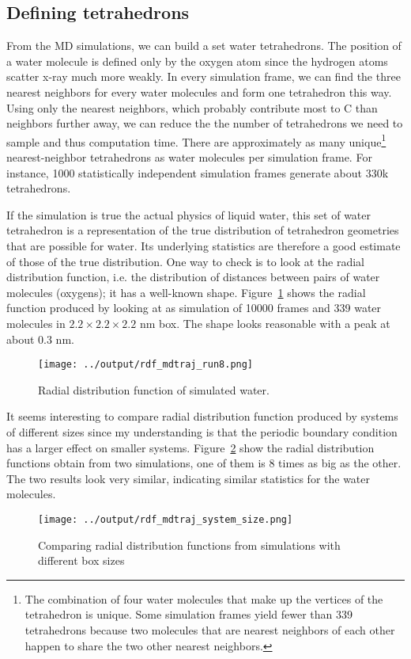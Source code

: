 \documentclass[20pt]{article}
\begin{document}
\subsection{Defining tetrahedrons}
From the MD simulations, we can build a set water tetrahedrons. The position of a water molecule is defined only by the oxygen atom since the hydrogen atoms scatter x-ray much more weakly. In every simulation frame, we can find the three nearest neighbors for every water molecules and form one tetrahedron this way. Using only the nearest neighbors, which probably contribute most to C than neighbors further away, we can reduce the the number of tetrahedrons we need to sample and thus computation time. There are approximately as many unique\footnote{The combination of four water molecules that make up the vertices of the tetrahedron is unique. Some simulation frames yield fewer than 339 tetrahedrons because two molecules that are nearest neighbors of each other happen to share the two other nearest neighbors.} nearest-neighbor tetrahedrons as water molecules per simulation frame. For instance, 1000 statistically independent simulation frames generate about 330k tetrahedrons. 

If the simulation is true the actual physics of liquid water, this set of water tetrahedron is a representation of the true distribution of tetrahedron geometries that are possible for water. Its underlying statistics are therefore a good estimate of those of the true distribution. One way  to check is to look at the radial distribution function, i.e. the distribution of distances between pairs of water molecules (oxygens); it has a well-known shape. Figure~\ref{fig:rdf_mdtraj} shows the radial function produced by looking at as simulation of 10000 frames and 339 water molecules in $2.2\times2.2\times2.2$ nm box. The shape looks reasonable with a peak at about 0.3 nm. 
\begin{figure}[!h] 
  \centering
    \texttt{[image: ../output/rdf\_mdtraj\_run8.png]}
     \caption{Radial distribution function of simulated water.} \label{fig:rdf_mdtraj}
\end{figure}

It seems interesting to compare radial distribution function produced by systems of different sizes since my understanding is that the periodic boundary condition has a larger effect on smaller systems. Figure~\ref{fig:rdf_mdtraj_sys_size} show the radial distribution functions obtain from two simulations, one of them is 8 times as big as the other. The two results look very similar, indicating similar statistics for the water molecules.
\begin{figure}[!h] 
  \centering
    \texttt{[image: ../output/rdf\_mdtraj\_system\_size.png]}
     \caption{Comparing radial distribution functions from simulations with different box sizes} \label{fig:rdf_mdtraj_sys_size}
\end{figure}
\end{document}
